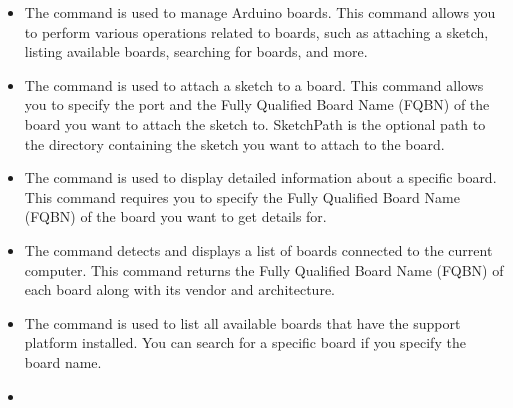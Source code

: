 \begin{itemize}

	\item {}

	The command  is used to manage Arduino boards. This command allows you to perform various operations related to boards, such as attaching a sketch, listing available boards, searching for boards, and more.

	
	\item{}
		
	The command  is used to attach a sketch to a board. This command allows you to specify the port and the Fully Qualified Board Name (FQBN) of the board you want to attach the sketch to. SketchPath is the optional path to the directory containing the sketch you want to attach to the board.
		
	
	
	\item {}
	
	The command  is used to display detailed information about a specific board. This command requires you to specify the Fully Qualified Board Name (FQBN) of the board you want to get details for.
	
	
	\item {}
	
	The command  detects and displays a list of boards connected to the current computer. This command returns the Fully Qualified Board Name (FQBN) of each board along with its vendor and architecture.
	
	
	\item {}
	
	The command  is used to list all available boards  that have the support platform installed. You can search for a specific board if you specify the board name.
	
	
	\item {}
	

\end{itemize}

